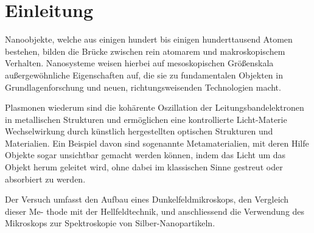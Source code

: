 
\chapter{Einleitung}
\label{chap:einleitung}

Nanoobjekte, welche aus einigen hundert bis einigen hunderttausend Atomen bestehen,
bilden die Brücke zwischen rein atomarem und makroskopischem Verhalten. Nanosysteme weisen hierbei auf mesoskopischen Größenskala außergewöhnliche Eigenschaften auf, die sie zu fundamentalen Objekten in Grundlagenforschung und neuen, richtungsweisenden Technologien macht.

Plasmonen wiederum sind die kohärente Oszillation der Leitungsbandelektronen in metallischen Strukturen und ermöglichen eine kontrollierte Licht-Materie Wechselwirkung durch künstlich hergestellten optischen Strukturen und Materialien. Ein Beispiel davon sind sogenannte Metamaterialien, mit deren Hilfe Objekte sogar
unsichtbar gemacht werden können, indem das Licht um das Objekt herum geleitet wird,
ohne dabei im klassischen Sinne gestreut oder absorbiert zu werden. 

Der Versuch umfasst den Aufbau eines Dunkelfeldmikroskops, den Vergleich dieser Me-
thode mit der Hellfeldtechnik, und anschliessend die Verwendung des Mikroskops zur
Spektroskopie von Silber-Nanopartikeln.